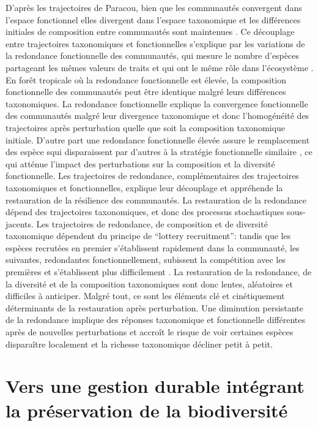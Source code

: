 \documentclass[
  11pt,
  french,
  A4paper,
  extrafontsizes,onecolumn,openright
  ]{memoir}
\begin{document}
D'après les trajectoires de Paracou, bien que les communautés convergent
dans l'espace fonctionnel elles divergent dans l'espace taxonomique et
les différences initiales de composition entre communautés sont
maintenues \autocite{Fukami2005}. Ce découplage entre trajectoires
taxonomiques et fonctionnelles s'explique par les variations de la
redondance fonctionnelle des communautés, qui mesure le nombre d'espèces
partageant les mêmes valeurs de traits et qui ont le même rôle dans
l'écosystème \autocite{Bellwood2006}. En forêt tropicale où la
redondance fonctionnelle est élevée, la composition fonctionnelle des
communautés peut être identique malgré leurs différences taxonomiques.
La redondance fonctionnelle explique la convergence fonctionnelle des
communautés malgré leur divergence taxonomique et donc l'homogénéité des
trajectoires après perturbation quelle que soit la composition
taxonomique initiale. D'autre part une redondance fonctionnelle élevée
assure le remplacement des espèce squi disparaissent par d'autres à la
stratégie fonctionnelle similaire \autocite{Carmona2016}, ce qui atténue
l'impact des perturbations sur la composition et la diversité
fonctionnelle. Les trajectoires de redondance, complémentaires des
trajectoires taxonomiques et fonctionnelles, explique leur découplage et
appréhende la restauration de la résilience des communautés. La
restauration de la redondance dépend des trajectoires taxonomiques, et
donc des processus stochastiques sous-jacents. Les trajectoires de
redondance, de composition et de diversité taxonomique dépendent du
principe de ``lottery recruitment'': tandis que les espèces recrutées en
premier s'établissent rapidement dans la communauté, les suivantes,
redondantes fonctionnellement, subissent la compétition avec les
premières et s'établissent plus difficilement \autocite{Busing2002}. La
restauration de la redondance, de la diversité et de la composition
taxonomiques sont donc lentes, aléatoires et difficiles à anticiper.
Malgré tout, ce sont les éléments clé et cinétiquement déterminants de
la restauration après perturbation. Une diminution persistante de la
redondance implique des réponses taxonomique et fonctionnelle
différentes après de nouvelles perturbations et accroît le risque de
voir certaines espèces disparaître localement et la richesse taxonomique
décliner petit à petit.

\section{Vers une gestion durable intégrant la préservation de la
biodiversité}\label{vers-une-gestion-durable-integrant-la-preservation-de-la-biodiversite}
\end{document}
